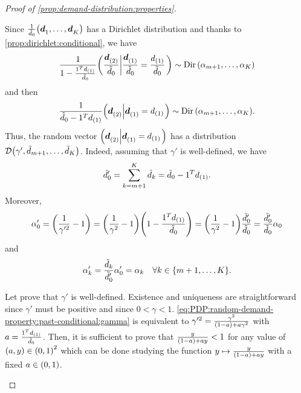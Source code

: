 \begin{proof}[Proof of \cref{prop:demand-distribution:properties}]
\begin{enumerate}
Since $\frac{1}{\tilde{\demand}_0}\bracket{\va\demand_1,\ldots,\va\demand_K}$ has a Dirichlet distribution and thanks to \cref{prop:dirichlet:conditional}, we have
\begin{equation}
\frac{1}{ 1- \frac{ 1^T\demand_{(1)} }{ \tilde{\demand}_0 } }
\left(
\frac{ \va\demand_{(2)} }{ \tilde{\demand}_0 }
\left|
\frac{ \va\demand_{(1)} }{ \tilde{\demand}_0 } = \frac{ \demand_{(1)} }{ \tilde{\demand}_0 }
\right.
\right)
\sim
\Dir\bracket{\alpha_{m+1},\ldots,\alpha_K}
\end{equation}
and then
\begin{equation}
\frac{1}{ \tilde{\demand}_0 - 1^T\demand_{(1)} }
\left(
\va\demand_{(2)}
\left|
\va\demand_{(1)} = \demand_{(1)}
\right.
\right)
\sim
\Dir\bracket{\alpha_{m+1},\ldots,\alpha_K}.
\end{equation}
Thus, the random vector
$
\left(
\va\demand_{(2)}
\left|
\va\demand_{(1)} = \demand_{(1)}
\right.
\right)
$
has a \distrib distribution $\cD\bracket{\gamma',\tilde{\demand}_{m+1},\ldots,\tilde{\demand}_K}$.
Indeed, assuming that $\gamma'$ is well-defined,
we have
\begin{equation}
  \tilde{d}_0' = \sum_{k=m+1}^K \tilde{d}_k = \tilde{d}_0 - 1^Td_{(1)}.
\end{equation}
Moreover,
\begin{equation}
  \alpha_0'
  = \bracket{\frac{1}{\gamma'^2}-1}
  = \bracket{\frac{1}{\gamma^2}-1}\bracket{1-\frac{1^T\demand_{(1)}}{\tilde{\demand}_0}}
  = \bracket{\frac{1}{\gamma^2}-1}\frac{\tilde{\demand}_0'}{\tilde{\demand}_0}
  = \frac{\tilde{\demand}_0'}{\tilde{\demand}_0}\alpha_0
\end{equation}
and
\begin{equation}
  \alpha_k' = \frac{\tilde{\demand}_k}{\tilde{\demand}_0'}\alpha_0' = \alpha_k\quad\forall k\in\range[m+1]{K}.
\end{equation}

Let prove that $\gamma'$ is well-defined.
Existence and uniqueness are straightforward since $\gamma'$ must be positive and since $0<\gamma<1$.
\cref{eq:PDP:random-demand-property:past-conditional:gamma} is equivalent to
$\gamma'^2 = \frac{\gamma^2}{\bracket{1-a}+a\gamma^2}$ with $a = \frac{1^Td_{(1)}}{\tilde{d}_0}$.
Then, it is sufficient to prove that $\frac{y}{\bracket{1-a}+ay}<1$ for any value of $\bracket{a,y}\in\bracket{0,1}^2$ which can be done studying the function $y\mapsto\frac{y}{\bracket{1-a}+ay}$ with a fixed $a\in\bracket{0,1}$.
\end{enumerate}
\end{proof}


